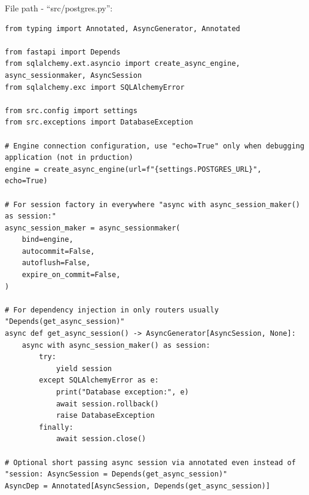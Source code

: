 File path - ``src/postgres.py'':
\begin{lstlisting}
from typing import Annotated, AsyncGenerator, Annotated

from fastapi import Depends
from sqlalchemy.ext.asyncio import create_async_engine, async_sessionmaker, AsyncSession
from sqlalchemy.exc import SQLAlchemyError

from src.config import settings
from src.exceptions import DatabaseException

# Engine connection configuration, use "echo=True" only when debugging application (not in prduction)
engine = create_async_engine(url=f"{settings.POSTGRES_URL}", echo=True)

# For session factory in everywhere "async with async_session_maker() as session:"
async_session_maker = async_sessionmaker(
    bind=engine,
    autocommit=False,
    autoflush=False,
    expire_on_commit=False,
)

# For dependency injection in only routers usually "Depends(get_async_session)"
async def get_async_session() -> AsyncGenerator[AsyncSession, None]:
    async with async_session_maker() as session:
        try:
            yield session
        except SQLAlchemyError as e:
            print("Database exception:", e)
            await session.rollback()
            raise DatabaseException
        finally:
            await session.close()

# Optional short passing async session via annotated even instead of "session: AsyncSession = Depends(get_async_session)"
AsyncDep = Annotated[AsyncSession, Depends(get_async_session)]
\end{lstlisting}

\clearpage

